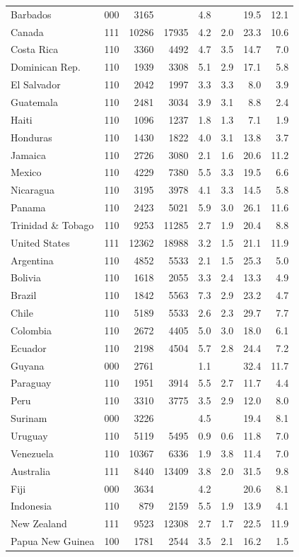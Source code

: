 \documentclass[11pt]{article}
\begin{document}
\begin{longtable}{lcrrrrrr}
Barbados&000&3165&&4.8&&19.5&12.1\\
Canada&111&10286&17935&4.2&2.0&23.3&10.6\\
Costa Rica&110&3360&4492&4.7&3.5&14.7&7.0\\
Dominican Rep.&110&1939&3308&5.1&2.9&17.1&5.8\\
El Salvador&110&2042&1997&3.3&3.3&8.0&3.9\\
Guatemala&110&2481&3034&3.9&3.1&8.8&2.4\\
Haiti&110&1096&1237&1.8&1.3&7.1&1.9\\
Honduras&110&1430&1822&4.0&3.1&13.8&3.7\\
Jamaica&110&2726&3080&2.1&1.6&20.6&11.2\\
Mexico&110&4229&7380&5.5&3.3&19.5&6.6\\
Nicaragua&110&3195&3978&4.1&3.3&14.5&5.8\\
Panama&110&2423&5021&5.9&3.0&26.1&11.6\\
Trinidad \& Tobago&110&9253&11285&2.7&1.9&20.4&8.8\\
United States&111&12362&18988&3.2&1.5&21.1&11.9\\
Argentina&110&4852&5533&2.1&1.5&25.3&5.0\\
Bolivia&110&1618&2055&3.3&2.4&13.3&4.9\\
Brazil&110&1842&5563&7.3&2.9&23.2&4.7\\
Chile&110&5189&5533&2.6&2.3&29.7&7.7\\
Colombia&110&2672&4405&5.0&3.0&18.0&6.1\\
Ecuador&110&2198&4504&5.7&2.8&24.4&7.2\\
Guyana&000&2761&&1.1&&32.4&11.7\\
Paraguay&110&1951&3914&5.5&2.7&11.7&4.4\\
Peru&110&3310&3775&3.5&2.9&12.0&8.0\\
Surinam&000&3226&&4.5&&19.4&8.1\\
Uruguay&110&5119&5495&0.9&0.6&11.8&7.0\\
Venezuela&110&10367&6336&1.9&3.8&11.4&7.0\\
Australia&111&8440&13409&3.8&2.0&31.5&9.8\\
Fiji&000&3634&&4.2&&20.6&8.1\\
Indonesia&110&879&2159&5.5&1.9&13.9&4.1\\
New Zealand&111&9523&12308&2.7&1.7&22.5&11.9\\
Papua New Guinea&100&1781&2544&3.5&2.1&16.2&1.5\\
\bottomrule\end{longtable}
\end{document}
